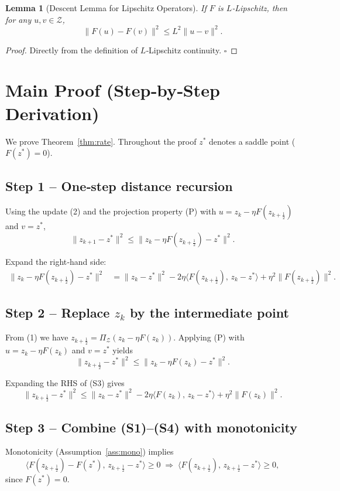 \documentclass{article}
\newtheorem{lemma}{Lemma}
\begin{document}
\begin{lemma}[Descent Lemma for Lipschitz Operators]\label{lem:descent}
If $F$ is $L$‑Lipschitz, then for any $u,v\in\mathcal Z$,
\[
\|F(u)-F(v)\|^{2}\le L^{2}\|u-v\|^{2}.
\tag{L}
\]
\end{lemma}
\begin{proof}
Directly from the definition of $L$‑Lipschitz continuity. \hfill $\square$
\end{proof}

\section*{Main Proof (Step‑by‑Step Derivation)}
We prove Theorem~\ref{thm:rate}.  Throughout the proof $z^{*}$ denotes a saddle point ($F(z^{*})=0$).

\subsection*{Step 1 – One‑step distance recursion}
Using the update (2) and the projection property (P) with $u=z_{k}-\eta F(z_{k+\frac12})$ and $v=z^{*}$,
\[
\|z_{k+1}-z^{*}\|^{2}
\le\|z_{k}-\eta F(z_{k+\frac12})-z^{*}\|^{2}.
\tag{S1}
\]

Expand the right‑hand side:
\[
\begin{aligned}
\|z_{k}-\eta F(z_{k+\frac12})-z^{*}\|^{2}
&=\|z_{k}-z^{*}\|^{2}
-2\eta\langle F(z_{k+\frac12}),\,z_{k}-z^{*}\rangle
+\eta^{2}\|F(z_{k+\frac12})\|^{2}.
\end{aligned}
\tag{S2}
\]

\subsection*{Step 2 – Replace $z_{k}$ by the intermediate point}
From (1) we have $z_{k+\frac12}= \Pi_{\mathcal Z}(z_{k}-\eta F(z_{k}))$.  
Applying (P) with $u=z_{k}-\eta F(z_{k})$ and $v=z^{*}$ yields
\[
\|z_{k+\frac12}-z^{*}\|^{2}
\le\|z_{k}-\eta F(z_{k})-z^{*}\|^{2}.
\tag{S3}
\]

Expanding the RHS of (S3) gives
\[
\|z_{k+\frac12}-z^{*}\|^{2}
\le\|z_{k}-z^{*}\|^{2}
-2\eta\langle F(z_{k}),\,z_{k}-z^{*}\rangle
+\eta^{2}\|F(z_{k})\|^{2}.
\tag{S4}
\]

\subsection*{Step 3 – Combine (S1)–(S4) with monotonicity}
Monotonicity (Assumption~\ref{ass:mono}) implies
\[
\langle F(z_{k+\frac12})-F(z^{*}),\,z_{k+\frac12}-z^{*}\rangle\ge0
\;\Longrightarrow\;
\langle F(z_{k+\frac12}),\,z_{k+\frac12}-z^{*}\rangle\ge0,
\tag{S5}
\]
since $F(z^{*})=0$.
\end{document}
